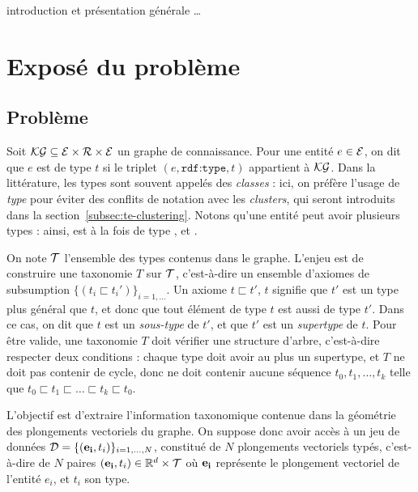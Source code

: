 \label{chap:te}

introduction et présentation générale \ldots


\section{Exposé du problème}
\subsection{Problème}
\label{sec:te-problem}
Soit $\KG \subseteq \Ent \times \Rel \times \Ent$ un graphe de connaissance. Pour une entité $e \in \Ent$, on dit que $e$ est de type $t$ si le triplet $(e, \texttt{rdf:type}, t)$ appartient à $\KG$. Dans la littérature, les types sont souvent appelés des \textit{classes} : ici, on préfère l'usage de \textit{type} pour éviter des conflits de notation avec les \textit{clusters}, qui seront introduits dans la section~\ref{subsec:te-clustering}. Notons qu'une entité peut avoir plusieurs types : ainsi,  est à la fois de type ,  et .

On note $\cal{T}$ l'ensemble des types contenus dans le graphe. L'enjeu est de construire une taxonomie $T$ sur $\cal{T}$, c'est-à-dire un ensemble d'axiomes de subsumption $\{(t_i \sqsubset t_i')\}_{i=1, \ldots}$. Un axiome $t \sqsubset t'$, $t$ signifie que $t'$ est un type plus général que $t$, et donc que tout élément de type $t$ est aussi de type $t'$. Dans ce cas, on dit que $t$ est un \textit{sous-type} de $t'$, et que $t'$ est un \textit{supertype} de $t$.
Pour être valide, une taxonomie $T$ doit vérifier une structure d'arbre, c'est-à-dire respecter deux conditions : chaque type doit avoir au plus un supertype, et $T$ ne doit pas contenir de cycle, donc ne doit contenir aucune séquence $t_0, t_1, \ldots, t_k$ telle que $t_0 \sqsubset t_1 \sqsubset \ldots \sqsubset t_k \sqsubset t_0$.


L'objectif est d'extraire l'information taxonomique contenue dans la géométrie des plongements vectoriels du graphe. On suppose donc avoir accès à un jeu de données $\cal{D} = \{ (\mathbf{e_i}, t_i) \}_{i=1, \ldots, N}$, constitué de $N$ plongements vectoriels typés, c'est-à-dire de $N$ paires $(\bf{e_i}, t_i) \in \R^d \times \cal{T}$ où $\bf{e_i}$ représente le plongement vectoriel de l'entité $e_i$, et $t_i$ son type. 



